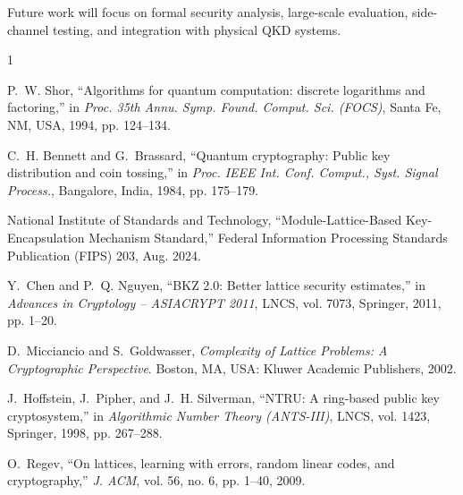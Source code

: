 \documentclass[journal,twocolumn]{IEEEtran}
\begin{document}
Future work will focus on formal security analysis, large-scale evaluation, side-channel testing, and integration with physical QKD systems.

\begin{thebibliography}{1}

P.~W. Shor,
``Algorithms for quantum computation: discrete logarithms and factoring,''
in \emph{Proc. 35th Annu. Symp. Found. Comput. Sci. (FOCS)},
Santa Fe, NM, USA, 1994, pp. 124--134.

C.~H. Bennett and G.~Brassard,
``Quantum cryptography: Public key distribution and coin tossing,''
in \emph{Proc. IEEE Int. Conf. Comput., Syst. Signal Process.},
Bangalore, India, 1984, pp. 175--179.

National Institute of Standards and Technology,
``Module-Lattice-Based Key-Encapsulation Mechanism Standard,''
Federal Information Processing Standards Publication (FIPS) 203,
Aug. 2024.

Y.~Chen and P.~Q. Nguyen,
``BKZ 2.0: Better lattice security estimates,''
in \emph{Advances in Cryptology -- ASIACRYPT 2011},
LNCS, vol. 7073, Springer, 2011, pp. 1--20.

D.~Micciancio and S.~Goldwasser,
\emph{Complexity of Lattice Problems: A Cryptographic Perspective}.
Boston, MA, USA: Kluwer Academic Publishers, 2002.

J.~Hoffstein, J.~Pipher, and J.~H. Silverman,
``NTRU: A ring-based public key cryptosystem,''
in \emph{Algorithmic Number Theory (ANTS-III)},
LNCS, vol. 1423, Springer, 1998, pp. 267--288.

O.~Regev,
``On lattices, learning with errors, random linear codes, and cryptography,''
\emph{J. ACM}, vol. 56, no. 6, pp. 1--40, 2009.

\end{thebibliography}
\end{document}
